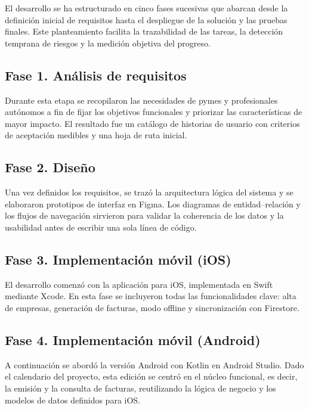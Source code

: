 \begin{large}

El desarrollo se ha estructurado en cinco fases sucesivas que abarcan desde la definición inicial de requisitos hasta el despliegue de la solución y las pruebas finales. Este planteamiento facilita la trazabilidad de las tareas, la detección temprana de riesgos y la medición objetiva del progreso.

\subsection*{Fase 1. Análisis de requisitos}

Durante esta etapa se recopilaron las necesidades de pymes y profesionales autónomos a fin de fijar los objetivos funcionales y priorizar las características de mayor impacto. El resultado fue un catálogo de historias de usuario con criterios de aceptación medibles y una hoja de ruta inicial.

\subsection*{Fase 2. Diseño}

Una vez definidos los requisitos, se trazó la arquitectura lógica del sistema y se elaboraron prototipos de interfaz en Figma. Los diagramas de entidad–relación y los flujos de navegación sirvieron para validar la coherencia de los datos y la usabilidad antes de escribir una sola línea de código.

\subsection*{Fase 3. Implementación móvil (iOS)}

El desarrollo comenzó con la aplicación para iOS, implementada en Swift mediante Xcode. En esta fase se incluyeron todas las funcionalidades clave: alta de empresas, generación de facturas, modo offline y sincronización con Firestore.

\subsection*{Fase 4. Implementación móvil (Android)}

A continuación se abordó la versión Android con Kotlin en Android Studio. Dado el calendario del proyecto, esta edición se centró en el núcleo funcional, es decir, la emisión y la consulta de facturas, reutilizando la lógica de negocio y los modelos de datos definidos para iOS.


\end{large}
